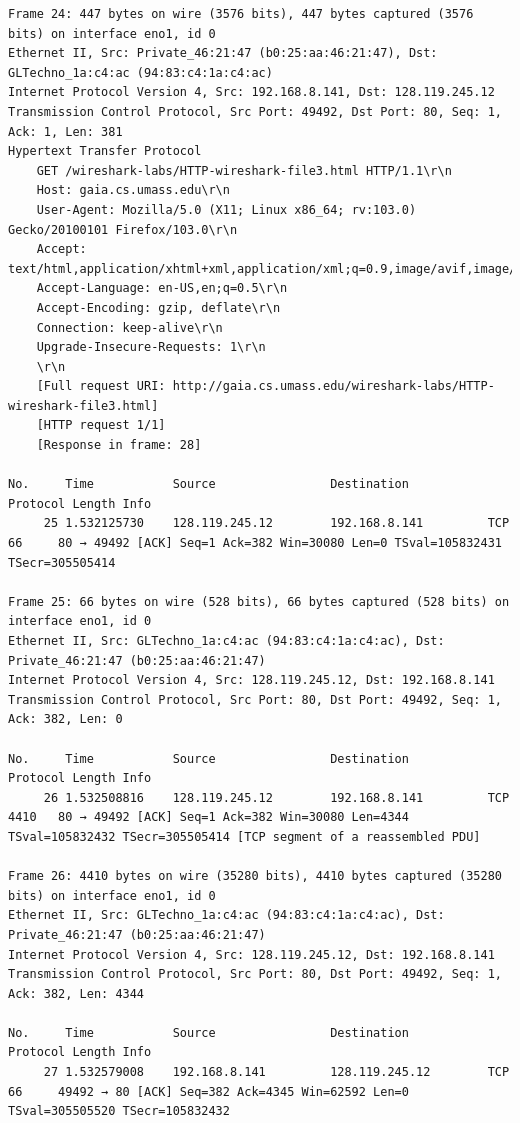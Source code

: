 \documentclass[a4paper,11pt,final]{report}
\begin{document}
\begin{lstlisting}[breaklines]
Frame 24: 447 bytes on wire (3576 bits), 447 bytes captured (3576 bits) on interface eno1, id 0
Ethernet II, Src: Private_46:21:47 (b0:25:aa:46:21:47), Dst: GLTechno_1a:c4:ac (94:83:c4:1a:c4:ac)
Internet Protocol Version 4, Src: 192.168.8.141, Dst: 128.119.245.12
Transmission Control Protocol, Src Port: 49492, Dst Port: 80, Seq: 1, Ack: 1, Len: 381
Hypertext Transfer Protocol
    GET /wireshark-labs/HTTP-wireshark-file3.html HTTP/1.1\r\n
    Host: gaia.cs.umass.edu\r\n
    User-Agent: Mozilla/5.0 (X11; Linux x86_64; rv:103.0) Gecko/20100101 Firefox/103.0\r\n
    Accept: text/html,application/xhtml+xml,application/xml;q=0.9,image/avif,image/webp,*/*;q=0.8\r\n
    Accept-Language: en-US,en;q=0.5\r\n
    Accept-Encoding: gzip, deflate\r\n
    Connection: keep-alive\r\n
    Upgrade-Insecure-Requests: 1\r\n
    \r\n
    [Full request URI: http://gaia.cs.umass.edu/wireshark-labs/HTTP-wireshark-file3.html]
    [HTTP request 1/1]
    [Response in frame: 28]

No.     Time           Source                Destination           Protocol Length Info
     25 1.532125730    128.119.245.12        192.168.8.141         TCP      66     80 → 49492 [ACK] Seq=1 Ack=382 Win=30080 Len=0 TSval=105832431 TSecr=305505414

Frame 25: 66 bytes on wire (528 bits), 66 bytes captured (528 bits) on interface eno1, id 0
Ethernet II, Src: GLTechno_1a:c4:ac (94:83:c4:1a:c4:ac), Dst: Private_46:21:47 (b0:25:aa:46:21:47)
Internet Protocol Version 4, Src: 128.119.245.12, Dst: 192.168.8.141
Transmission Control Protocol, Src Port: 80, Dst Port: 49492, Seq: 1, Ack: 382, Len: 0

No.     Time           Source                Destination           Protocol Length Info
     26 1.532508816    128.119.245.12        192.168.8.141         TCP      4410   80 → 49492 [ACK] Seq=1 Ack=382 Win=30080 Len=4344 TSval=105832432 TSecr=305505414 [TCP segment of a reassembled PDU]

Frame 26: 4410 bytes on wire (35280 bits), 4410 bytes captured (35280 bits) on interface eno1, id 0
Ethernet II, Src: GLTechno_1a:c4:ac (94:83:c4:1a:c4:ac), Dst: Private_46:21:47 (b0:25:aa:46:21:47)
Internet Protocol Version 4, Src: 128.119.245.12, Dst: 192.168.8.141
Transmission Control Protocol, Src Port: 80, Dst Port: 49492, Seq: 1, Ack: 382, Len: 4344

No.     Time           Source                Destination           Protocol Length Info
     27 1.532579008    192.168.8.141         128.119.245.12        TCP      66     49492 → 80 [ACK] Seq=382 Ack=4345 Win=62592 Len=0 TSval=305505520 TSecr=105832432


\end{lstlisting}
\end{document}

